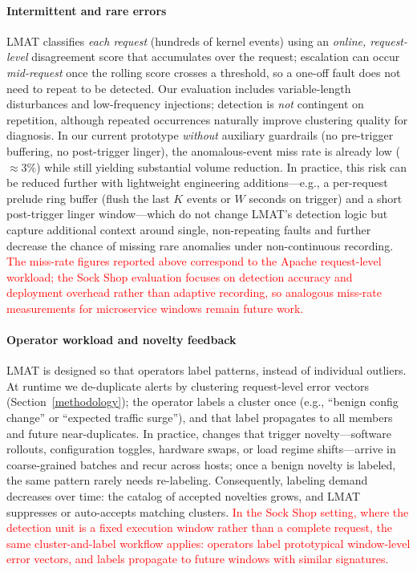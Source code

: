 \documentclass[preprint,12pt]{elsarticle}
\begin{document}
\paragraph{Intermittent and rare errors}
LMAT classifies \emph{each request} (hundreds of kernel events) using an \emph{online, request-level} disagreement score that accumulates over the request; escalation can occur \emph{mid-request} once the rolling score crosses a threshold, so a one-off fault does not need to repeat to be detected. Our evaluation includes variable-length disturbances and low-frequency injections; detection is \emph{not} contingent on repetition, although repeated occurrences naturally improve clustering quality for diagnosis.
In our current prototype \emph{without} auxiliary guardrails (no pre-trigger buffering, no post-trigger linger), the anomalous-event miss rate is already low ($\approx3\%$) while still yielding substantial volume reduction. In practice, this risk can be reduced further with lightweight engineering additions—e.g., a per-request prelude ring buffer (flush the last $K$ events or $W$ seconds on trigger) and a short post-trigger linger window—which do not change LMAT’s detection logic but capture additional context around single, non-repeating faults and further decrease the chance of missing rare anomalies under non-continuous recording. \textcolor{red}{The miss-rate figures reported above correspond to the Apache request-level workload; the Sock Shop evaluation focuses on detection accuracy and deployment overhead rather than adaptive recording, so analogous miss-rate measurements for microservice windows remain future work.}




\paragraph{Operator workload and novelty feedback}
LMAT is designed so that operators label patterns, instead of individual outliers. At runtime we de-duplicate alerts by clustering request-level error vectors (Section~\ref{methodology}); the operator labels a cluster once (e.g., “benign config change” or “expected traffic surge”), and that label propagates to all members and future near-duplicates. In practice, changes that trigger novelty—software rollouts, configuration toggles, hardware swaps, or load regime shifts—arrive in coarse-grained batches and recur across hosts; once a benign novelty is labeled, the same pattern rarely needs re-labeling. Consequently, labeling demand decreases over time: the catalog of accepted novelties grows, and LMAT suppresses or auto-accepts matching clusters. \textcolor{red}{In the Sock Shop setting, where the detection unit is a fixed execution window rather than a complete request, the same cluster-and-label workflow applies: operators label prototypical window-level error vectors, and labels propagate to future windows with similar signatures.}
\end{document}
